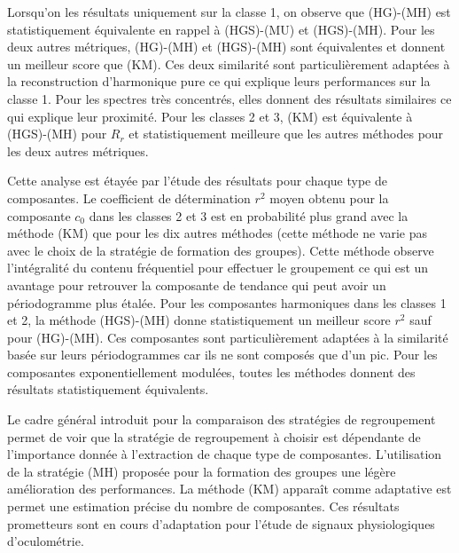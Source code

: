 \documentclass{gretsi}
\begin{document}
\begin{sloppypar}
Lorsqu'on les résultats uniquement sur la classe 1, on observe que (HG)-(MH) est statistiquement équivalente en rappel à (HGS)-(MU) et (HGS)-(MH). 
Pour les deux autres métriques, (HG)-(MH) et (HGS)-(MH) sont équivalentes et donnent un meilleur score que (KM).
Ces deux similarité sont particulièrement adaptées à la reconstruction d'harmonique pure ce qui explique leurs performances sur la classe 1. 
Pour les spectres très concentrés, elles donnent des résultats similaires ce qui explique leur proximité.
Pour les classes 2 et 3, (KM) est équivalente à (HGS)-(MH) pour $R_r$ et statistiquement meilleure que les autres méthodes pour les deux autres métriques.

Cette analyse est étayée par l'étude des résultats pour chaque type de composantes.
Le coefficient de détermination $r^2$ moyen obtenu pour la composante $c_0$ dans les classes 2 et 3 est en probabilité plus grand avec la méthode (KM) que pour les dix autres méthodes (cette méthode ne varie pas avec le choix de la stratégie de formation des groupes). 
Cette méthode observe l'intégralité du contenu fréquentiel pour effectuer le groupement ce qui est un avantage pour retrouver la composante de tendance qui peut avoir un périodogramme plus étalée. 
Pour les composantes harmoniques dans les classes 1 et 2, la méthode (HGS)-(MH) donne statistiquement un meilleur score $r^2$ sauf pour (HG)-(MH). 
Ces composantes sont particulièrement adaptées à la similarité basée sur leurs périodogrammes car ils ne sont composés que d'un pic.
Pour les composantes exponentiellement modulées, toutes les méthodes donnent des résultats statistiquement équivalents.
\end{sloppypar}

Le cadre général introduit pour la comparaison des stratégies de regroupement permet de voir que la stratégie de regroupement à choisir est dépendante de l'importance donnée à l'extraction de chaque type de composantes.
L'utilisation de la stratégie (MH) proposée pour la formation des groupes une légère amélioration des performances.
La méthode (KM) apparaît comme adaptative est permet une estimation précise du nombre de composantes.
Ces résultats prometteurs sont en cours d'adaptation pour l'étude de signaux physiologiques d'oculométrie.


 
\scriptsize
{}
\end{document}
